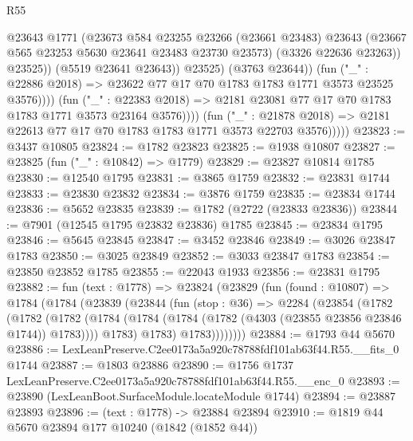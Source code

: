\begin{lexlean}{R55}
\begin{coremodule}
                                  @23643
                                  @1771
                                  (@23673
                                    @584
                                    @23255
                                    @23266
                                    (@23661 @23483)
                                    @23643
                                    (@23667 @565 @23253 @5630 @23641 @23483 @23730 @23573)
                                    (@3326 @22636 @23263))
                                  @23525))
                              (@5519 @23641 @23643))
                            @23525)
                          (@3763 @23644))
                        (fun ("_" : @22886 @2018) =>
                        @23622 @77 @17 @70 @1783 @1783 @1771 @3573 @23525 @3576))))
                  (fun ("_" : @22383 @2018) =>
                  @2181 @23081 @77 @17 @70 @1783 @1783 @1771 @3573 @23164 @3576))))
            (fun ("_" : @21878 @2018) =>
            @2181 @22613 @77 @17 @70 @1783 @1783 @1771 @3573 @22703 @3576)))))
@23823 := @3437 @10805
@23824 := @1782 @23823
@23825 := @1938 @10807
@23827 := @23825 (fun ("_" : @10842) => @1779)
@23829 := @23827 @10814 @1785
@23830 := @12540 @1795
@23831 := @3865 @1759
@23832 := @23831 @1744
@23833 := @23830 @23832
@23834 := @3876 @1759
@23835 := @23834 @1744
@23836 := @5652 @23835
@23839 := @1782 (@2722 (@23833 @23836))
@23844 := @7901 (@12545 @1795 @23832 @23836) @1785
@23845 := @23834 @1795
@23846 := @5645 @23845
@23847 := @3452 @23846
@23849 := @3026 @23847 @1783
@23850 := @3025 @23849
@23852 := @3033 @23847 @1783
@23854 := @23850 @23852 @1785
@23855 := @22043 @1933
@23856 := @23831 @1795
@23882 := fun (text : @1778) =>
  @23824
    (@23829
      (fun (found : @10807) =>
      @1784
        (@1784
          (@23839
            (@23844
              (fun (stop : @36) =>
              @2284
                (@23854
                  (@1782
                    (@1782
                      (@1782
                        (@1784 (@1784 (@1784 (@1782 (@4303 (@23855 @23856 @23846 @1744)) @1783))))
                        @1783)
                      @1783)
                    @1783))))))))
@23884 := @1793 @44 @5670
@23886 := LexLeanPreserve.C2ee0173a5a920c78788fdf101ab63f44.R55.__fits_0 @1744
@23887 := @1803 @23886
@23890 := @1756 @1737 LexLeanPreserve.C2ee0173a5a920c78788fdf101ab63f44.R55.__enc_0
@23893 := @23890 (LexLeanBoot.SurfaceModule.locateModule @1744)
@23894 := @23887 @23893
@23896 := (text : @1778) -> @23884 @23894
@23910 := @1819
    @44
    @5670
    @23894
    @177
    @10240
    (@1842 (@1852 @44))

\end{coremodule}
\end{lexlean}
